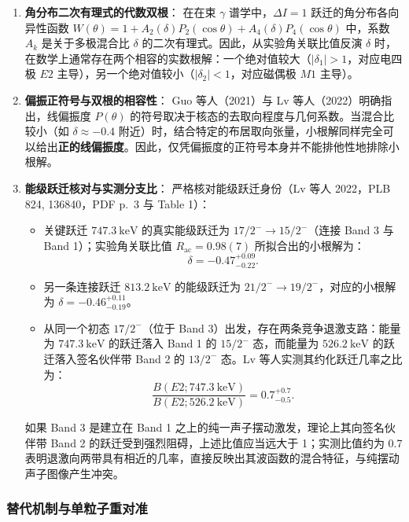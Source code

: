 \begin{enumerate}
\item \textbf{角分布二次有理式的代数双根}：
在在束 $\gamma$ 谱学中，$\Delta I = 1$ 跃迁的角分布各向异性函数 $W(\theta) = 1 + A_2(\delta) P_2(\cos\theta) + A_4(\delta) P_4(\cos\theta)$ 中，系数 $A_k$ 是关于多极混合比 $\delta$ 的二次有理式。因此，从实验角关联比值反演 $\delta$ 时，在数学上通常存在两个相容的实数根解：一个绝对值较大（$|\delta_1| > 1$，对应电四极 $E2$ 主导），另一个绝对值较小（$|\delta_2| < 1$，对应磁偶极 $M1$ 主导）。
\item \textbf{偏振正符号与双根的相容性}：
Guo 等人（2021）与 Lv 等人（2022）明确指出，线偏振度 $P(\theta)$ 的符号取决于核态的去取向程度与几何系数。当混合比较小（如 $\delta \approx -0.4$ 附近）时，结合特定的布居取向张量，小根解同样完全可以给出\textbf{正的线偏振度}。因此，仅凭偏振度的正符号本身并不能排他性地排除小根解。
\item \textbf{能级跃迁核对与实测分支比}：
严格核对能级跃迁身份（Lv 等人 2022，PLB 824, 136840，PDF p.~3 与 Table 1）：
\begin{itemize}
\item 关键跃迁 $747.3\ \mathrm{keV}$ 的真实能级跃迁为 $17/2^- \to 15/2^-$（连接 Band 3 与 Band 1）；实验角关联比值 $R_{\mathrm{ac}} = 0.98(7)$ 所拟合出的小根解为：
\begin{equation}\label{eq:4-4-pr135-small-delta}
\delta = -0.47_{-0.22}^{+0.09}.
\end{equation}
\item 另一条连接跃迁 $813.2\ \mathrm{keV}$ 的能级跃迁为 $21/2^- \to 19/2^-$，对应的小根解为 $\delta = -0.46_{-0.19}^{+0.11}$。
\item 从同一个初态 $17/2^-$（位于 Band 3）出发，存在两条竞争退激支路：能量为 $747.3\ \mathrm{keV}$ 的跃迁落入 Band 1 的 $15/2^-$ 态，而能量为 $526.2\ \mathrm{keV}$ 的跃迁落入签名伙伴带 Band 2 的 $13/2^-$ 态。Lv 等人实测其约化跃迁几率之比为：
\begin{equation}\label{eq:4-4-pr135-branch-ratio}
\frac{B(E2; 747.3\ \mathrm{keV})}{B(E2; 526.2\ \mathrm{keV})} = 0.7_{-0.5}^{+0.7}.
\end{equation}
\end{itemize}
如果 Band 3 是建立在 Band 1 之上的纯一声子摆动激发，理论上其向签名伙伴带 Band 2 的跃迁受到强烈阻碍，上述比值应当远大于 1；实测比值约为 0.7 表明退激向两带具有相近的几率，直接反映出其波函数的混合特征，与纯摆动声子图像产生冲突。
\end{enumerate}

\subsubsection{替代机制与单粒子重对准}

